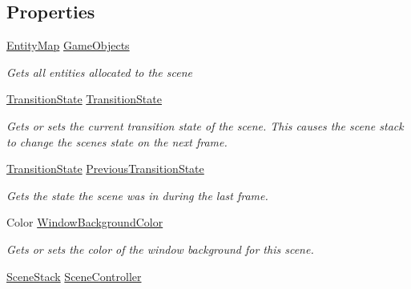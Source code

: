\subsection*{Properties}
\begin{DoxyCompactItemize}
\item 
\hyperlink{class_m_b2_d_1_1_entity_component_1_1_entity_map}{Entity\+Map} \hyperlink{class_m_b2_d_1_1_scenes_1_1_scene_aae9f1aa11591fa124e5da41f53138ea1}{Game\+Objects}
\begin{DoxyCompactList}\small\item\em Gets all entities allocated to the scene \end{DoxyCompactList}\item 
\hyperlink{namespace_m_b2_d_1_1_scenes_a0e0db3f97bbaa272f70534c5954c4acc}{Transition\+State} \hyperlink{class_m_b2_d_1_1_scenes_1_1_scene_a6167906306d4c7d9a7a4fbd6909c9d12}{Transition\+State}
\begin{DoxyCompactList}\small\item\em Gets or sets the current transition state of the scene. This causes the scene stack to change the scenes state on the next frame. \end{DoxyCompactList}\item 
\hyperlink{namespace_m_b2_d_1_1_scenes_a0e0db3f97bbaa272f70534c5954c4acc}{Transition\+State} \hyperlink{class_m_b2_d_1_1_scenes_1_1_scene_ac683a1684a15a3da44197188e13d2c2a}{Previous\+Transition\+State}
\begin{DoxyCompactList}\small\item\em Gets the state the scene was in during the last frame. \end{DoxyCompactList}\item 
Color \hyperlink{class_m_b2_d_1_1_scenes_1_1_scene_abfa7329c484e4af3153469eb278fcb69}{Window\+Background\+Color}
\begin{DoxyCompactList}\small\item\em Gets or sets the color of the window background for this scene. \end{DoxyCompactList}\item 
\hyperlink{class_m_b2_d_1_1_scenes_1_1_scene_stack}{Scene\+Stack} \hyperlink{class_m_b2_d_1_1_scenes_1_1_scene_ad32d9d738f33bd710184f7eda6a43ddf}{Scene\+Controller}

\end{DoxyCompactItemize}
